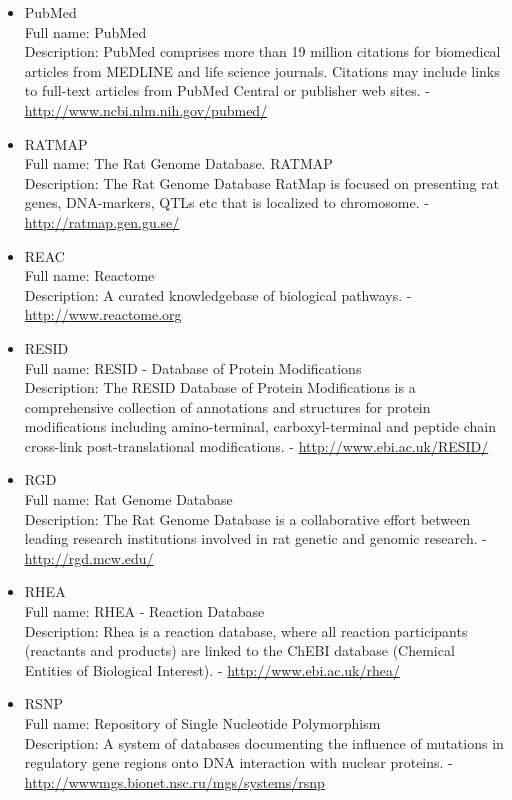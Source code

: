 \begin{itemize}
\item{PubMed}\\ Full name: PubMed\\ Description: PubMed comprises more than 19 million citations for biomedical articles from MEDLINE and life science journals. Citations may include links to full-text articles from PubMed Central or publisher web sites. - 
\url{http://www.ncbi.nlm.nih.gov/pubmed/}

\item{RATMAP}\\ Full name: The Rat Genome Database. RATMAP\\ Description: The Rat Genome Database RatMap is focused on presenting rat genes, DNA-markers, QTLs etc that is localized to chromosome. - 
\url{http://ratmap.gen.gu.se/}

\item{REAC}\\ Full name: Reactome\\ Description: A curated knowledgebase of biological pathways. - 
\url{http://www.reactome.org}

\item{RESID}\\ Full name: RESID - Database of Protein Modifications\\ Description: The RESID Database of Protein Modifications is a comprehensive collection of annotations and structures for protein modifications including amino-terminal, carboxyl-terminal and peptide chain cross-link post-translational modifications. - 
\url{http://www.ebi.ac.uk/RESID/}

\item{RGD}\\ Full name: Rat Genome Database\\ Description: The Rat Genome Database is a collaborative effort between leading research institutions involved in rat genetic and genomic research. - 
\url{http://rgd.mcw.edu/}

\item{RHEA}\\ Full name: RHEA - Reaction Database\\ Description: Rhea is a reaction database, where all reaction participants (reactants and products) are linked to the ChEBI database (Chemical Entities of Biological Interest). - 
\url{http://www.ebi.ac.uk/rhea/}

\item{RSNP}\\ Full name: Repository of Single Nucleotide Polymorphism\\ Description: A system of databases documenting the influence of mutations in regulatory gene regions onto DNA interaction with nuclear proteins. - 
\url{http://wwwmgs.bionet.nsc.ru/mgs/systems/rsnp}


\end{itemize}
